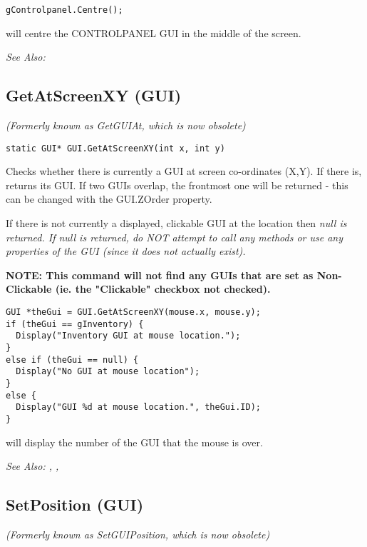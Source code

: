 \begin{verbatim}
gControlpanel.Centre();
\end{verbatim}
will centre the CONTROLPANEL GUI in the middle of the screen.

\it{See Also:} 


\subsection{GetAtScreenXY (GUI)}\label{GUI.GetAtScreenXY}%

\it{(Formerly known as GetGUIAt, which is now obsolete)}

\begin{verbatim}
static GUI* GUI.GetAtScreenXY(int x, int y)
\end{verbatim}
Checks whether there is currently a GUI at screen co-ordinates (X,Y). If
there is, returns its GUI. If two GUIs overlap, the frontmost one will
be returned - this can be changed with the GUI.ZOrder property.

If there is not currently a displayed, clickable GUI at the location then
\it{null} is returned. If null is returned, do NOT attempt to call any methods
or use any properties of the GUI (since it does not actually exist).

\bf{NOTE:} This command will not find any GUIs that are set as Non-Clickable (ie.
the "Clickable" checkbox not checked).

\begin{verbatim}
GUI *theGui = GUI.GetAtScreenXY(mouse.x, mouse.y);
if (theGui == gInventory) {
  Display("Inventory GUI at mouse location.");
}
else if (theGui == null) {
  Display("No GUI at mouse location");
}
else {
  Display("GUI %d at mouse location.", theGui.ID);
}
\end{verbatim}
will display the number of the GUI that the mouse is over.

\it{See Also:} , ,


\subsection{SetPosition (GUI)}\label{GUI.SetPosition}%

\it{(Formerly known as SetGUIPosition, which is now obsolete)}

